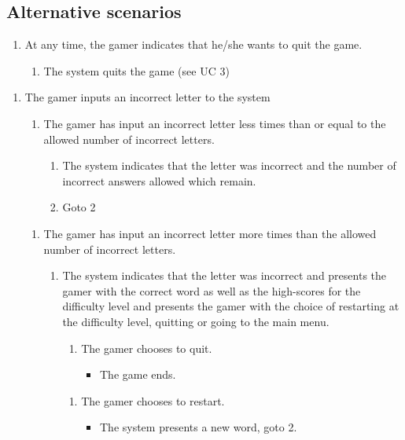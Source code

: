 \documentclass[12pt, letterpaper]{article}
\begin{document}
\subsection{Alternative scenarios}
\begin{enumerate}[label=a*.]
	\item At any time, the gamer indicates that he/she wants to quit the game.
	\begin{enumerate}[label=a*.1.]
		\item The system quits the game (see UC 3)
	\end{enumerate}
\end{enumerate}
\begin{enumerate}[label=3.1.]
	\item The gamer inputs an incorrect letter to the system
	\begin{enumerate}[label=3.1 a.]
		\item The gamer has input an incorrect letter less times than or equal to the allowed number of incorrect letters.
		\begin{enumerate}[label=3.1 a.\arabic*]
			\item The system indicates that the letter was incorrect and the number of incorrect answers allowed which remain.
			\item Goto 2
		\end{enumerate}
	\end{enumerate}
	\begin{enumerate}[label=3.1 b]
		\item The gamer has input an incorrect letter more times than the allowed number of incorrect letters. 
		
		\begin{enumerate}[label=3.1 b.\arabic*]
			\item The system indicates that the letter was incorrect and presents the gamer with the correct word as well as the  high-scores for the difficulty level and presents the gamer with the choice of restarting at the difficulty level, quitting or going to the main menu.
			\begin{enumerate}[label=3.1 b.1]
				\item The gamer chooses to quit.
				\begin{itemize}
					\item The game ends. 
				\end{itemize}

			\end{enumerate}
			\begin{enumerate}[label=3.1 b.2.]
				\item The gamer chooses to restart.
				\begin{itemize}
					\item The system presents a new word, goto 2.
				\end{itemize}
			\end{enumerate}
			

\end{enumerate}
\end{enumerate}
\end{enumerate}
\end{document}
